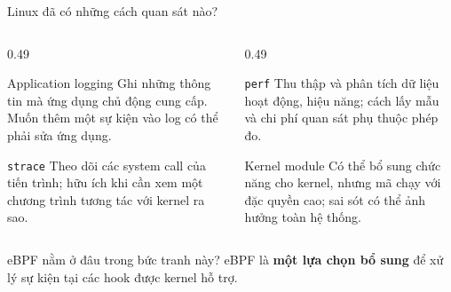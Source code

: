 \begin{frame}{Linux đã có những cách quan sát nào?}
  \begin{columns}[T,onlytextwidth]
    \begin{column}{0.49\textwidth}
      \begin{block}{Application logging}
        Ghi những thông tin mà ứng dụng chủ động cung cấp.
        Muốn thêm một sự kiện vào log có thể phải sửa ứng dụng.
      \end{block}
      \begin{block}{\texttt{strace}}
        Theo dõi các system call của tiến trình; hữu ích khi cần xem
        một chương trình tương tác với kernel ra sao.
      \end{block}
    \end{column}
    \begin{column}{0.49\textwidth}
      \begin{block}{\texttt{perf}}
        Thu thập và phân tích dữ liệu hoạt động, hiệu năng; cách lấy mẫu
        và chi phí quan sát phụ thuộc phép đo.
      \end{block}
      \begin{block}{Kernel module}
        Có thể bổ sung chức năng cho kernel, nhưng mã chạy với đặc quyền cao;
        sai sót có thể ảnh hưởng toàn hệ thống.
      \end{block}
    \end{column}
  \end{columns}
  \vspace{0.02cm}
  \begin{alertblock}{eBPF nằm ở đâu trong bức tranh này?}
    eBPF là \textbf{một lựa chọn bổ sung} để xử lý sự kiện tại các hook được kernel hỗ trợ.
  \end{alertblock}
\end{frame}

